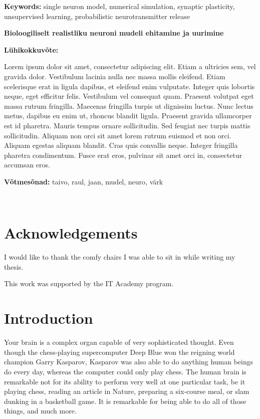 \documentclass[a4paper,12pt]{report}
\theoremstyle{definition}
\newcommand{\thesistitleEST}{Bioloogiliselt realistliku neuroni mudeli ehitamine ja uurimine}
\begin{document}
\textbf{Keywords:} single neuron model, numerical simulation, synaptic plasticity, unsupervised learning, probabilistic neurotransmitter release

\vspace{1.5cm}



{\textbf
{\Large \thesistitleEST}}

\textbf{Lühikokkuvõte:}

Lorem ipsum dolor sit amet, consectetur adipiscing elit. Etiam a ultricies sem, vel gravida dolor. Vestibulum lacinia nulla nec massa mollis eleifend. Etiam scelerisque erat in ligula dapibus, et eleifend enim vulputate. Integer quis lobortis neque, eget efficitur felis. Vestibulum vel consequat quam. Praesent volutpat eget massa rutrum fringilla. Maecenas fringilla turpis ut dignissim luctus. Nunc lectus metus, dapibus eu enim ut, rhoncus blandit ligula. Praesent gravida ullamcorper est id pharetra. Mauris tempus ornare sollicitudin. Sed feugiat nec turpis mattis sollicitudin. Aliquam non orci sit amet lorem rutrum euismod et non orci. Aliquam egestas aliquam blandit. Cras quis convallis neque. Integer fringilla pharetra condimentum. Fusce erat eros, pulvinar sit amet orci in, consectetur accumsan eros.

\textbf{Võtmesõnad:} taivo, raul, jaan, mudel, neuro, värk


\
\thispagestyle{empty}
\pagebreak

\chapter*{Acknowledgements}

I would like to thank the comfy chairs I was able to sit in while writing my thesis.

This work was supported by the IT Academy program.



\tableofcontents
\newpage




\chapter*{Introduction}


Your brain is a complex organ capable of very sophisticated thought. Even though the chess-playing supercomputer Deep Blue won the reigning world champion Garry Kasparov, Kasparov was also able to do anything human beings do every day, whereas the computer could only play chess. The human brain is remarkable not for its ability to perform very well at one particular task, be it playing chess, reading an article in Nature, preparing a six-course meal, or slam dunking in a basketball game. It is remarkable for being able to do all of those things, and much more.
\end{document}
